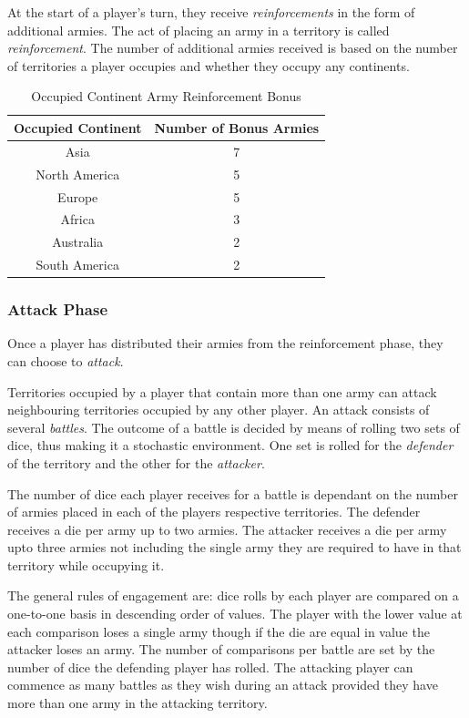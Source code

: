 \documentclass[parskip]{cs4rep}
\begin{document}
At the start of a player's turn, they receive \textit{reinforcements} in the form of additional armies. The act of placing an army in a territory is called \textit{reinforcement}.  The number of additional armies received is based on the number of territories a player occupies and whether they occupy any continents.
\newline

\begin{table}[ht]
\centering
\begin{tabular}{|c|c|}
\hline 
\textbf{Occupied Continent} & \textbf{Number of Bonus Armies} \\ 
\hline 
Asia & 7 \\ 
\hline 
North America & 5 \\ 
\hline 
Europe & 5 \\ 
\hline 
Africa & 3 \\
\hline
Australia & 2 \\
\hline  
South America & 2 \\
\hline 
\end{tabular}
\caption{Occupied Continent Army Reinforcement Bonus}
\label{table:continent-bonus}
\end{table}

\subsubsection{Attack Phase}

Once a player has distributed their armies from the reinforcement phase, they can choose to \textit{attack}. 

Territories occupied by a player that contain more than one army can attack neighbouring territories occupied by any other player. An attack consists of several \textit{battles}. The outcome of a battle is decided by means of rolling two sets of dice, thus making it a stochastic environment. One set is rolled for the \textit{defender} of the territory and the other for the \textit{attacker}. 

The number of dice each player receives for a battle is dependant on the number of armies placed in each of the players respective territories. The defender receives a die per army up to two armies. The attacker receives a die per army upto three armies not including the single army they are required to have in that territory while occupying it. 

The general rules of engagement are: dice rolls by each player are compared on a one-to-one basis in descending order of values. The player with the lower value at each comparison loses a single army though if the die are equal in value the attacker loses an army. The number of comparisons per battle are set by the number of dice the defending player has rolled. The attacking player can commence as many battles as they wish during an attack provided they have more than one army in the attacking territory.
\end{document}

